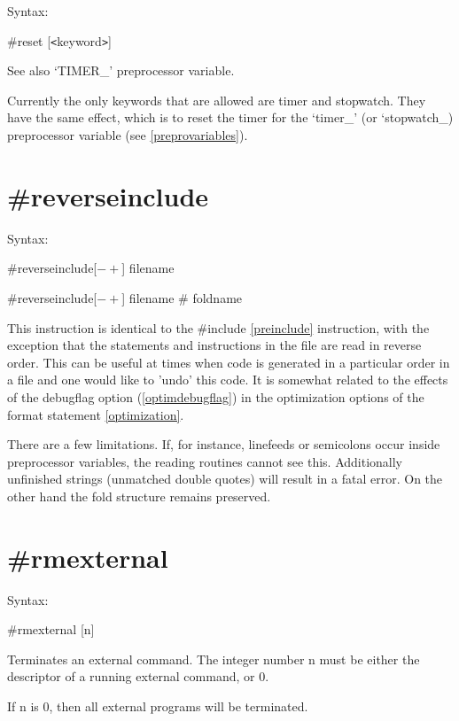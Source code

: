 \noindent Syntax:

\#reset [{\tt<}keyword{\tt>}]

\noindent See also `TIMER\_' preprocessor variable.

\noindent Currently the only keywords that are allowed are timer and 
stopwatch. They have the same effect, which is to reset the timer for the 
`timer\_' (or `stopwatch\_) preprocessor variable (see \ref{preprovariables}).


\section{\#reverseinclude}
\label{prereverseinclude}

\noindent Syntax:

\#reverseinclude[$-+$] filename

\#reverseinclude[$-+$] filename \# foldname

\noindent This instruction is identical to the \#include \ref{preinclude} 
instruction, with the exception that the statements and instructions in the 
file are read in reverse order. This can be useful at times when code is 
generated in a particular order in a file and one would like to 'undo' this 
code. It is somewhat related to the effects of the debugflag option 
(\ref{optimdebugflag}) in the optimization options of the format statement 
\ref{optimization}.

There are a few limitations. If, for instance, linefeeds or semicolons 
occur inside preprocessor variables, the reading routines cannot see this. 
Additionally unfinished strings (unmatched double quotes) will result in 
a fatal error. On the other hand the fold structure remains preserved.


\section{\#rmexternal}
\label{prermexternal}

\noindent Syntax:

\#rmexternal [n]

\noindent Terminates an external command. The integer 
number n must be either the descriptor of a running external command, or 0.

If n is 0, then all external programs will be terminated.

